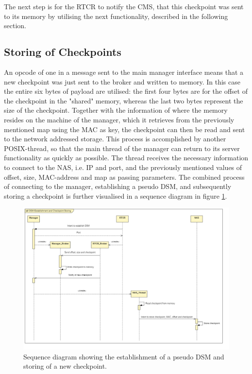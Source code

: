The next step is for the RTCR to notify the CMS, that this checkpoint was sent to its memory by utilising the next functionality, described in the following section.
\subsection{Storing of Checkpoints}
An opcode of one in a message sent to the main manager interface means that a new checkpoint was just sent to the broker and written to memory. In this case the entire six bytes of payload are utilised: the first four bytes are for the offset of the checkpoint in the "shared" memory, whereas the last two bytes represent the size of the checkpoint. Together with the information of where the memory resides on the machine of the manager, which it retrieves from the previously mentioned map using the MAC as key, the checkpoint can then be read and sent to the network addressed storage. This process is accomplished by another POSIX-thread, so that the main thread of the manager can return to its server functionality as quickly as possible. The thread receives the necessary information to connect to the NAS, i.e. IP and port, and the previously mentioned values of offset, size, MAC-address and map as passing parameters. The combined process of connecting to the manager, establishing a pseudo DSM, and subsequently storing a checkpoint is further visualised in a sequence diagram in figure \ref{fig:dsm-and-store_sequence}.
\begin{figure}
    \centering
    \includegraphics[width=1.25\textwidth, angle=90]{Images/dsm-and-store_sequence.png}
    \caption{Sequence diagram showing the establishment of a pseudo DSM and storing of a new checkpoint.}
    \label{fig:dsm-and-store_sequence}
\end{figure}
